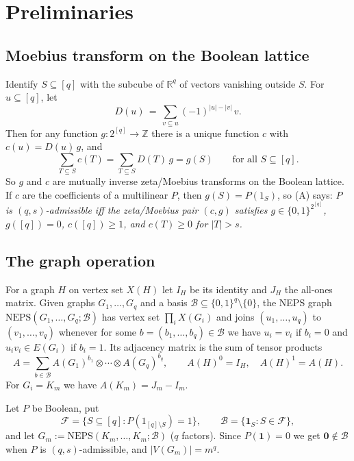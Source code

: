 \documentclass[11pt,a4paper]{article}
\theoremstyle{plain}
\theoremstyle{definition}
\newcommand{\ZZ}{\mathbb{Z}}
\begin{document}
\section{Preliminaries}

\subsection{Moebius transform on the Boolean lattice}

Identify $S\subseteq[q]$ with the subcube of $\mathbb R^q$ of vectors vanishing outside
$S$.  For $u\subseteq[q]$, let
\[
D(u)\,=\,\sum_{v\subseteq u}(-1)^{|u|-|v|}\,v .
\]
Then for any function $g:2^{[q]}\to\ZZ$ there is a unique function $c$ with
$c(u)=D(u)\,g$, and
\begin{equation}
\label{eq:zeta}
\sum_{T\subseteq S}c(T)=\sum_{T\subseteq S}D(T)\,g=g(S)\qquad\text{for all }S\subseteq[q].
\end{equation}
So $g$ and $c$ are mutually inverse zeta/Moebius transforms on the Boolean lattice.  If
$c$ are the coefficients of a multilinear $P$, then $g(S)=P(1_S)$, so \textup{(A)} says:
\emph{$P$ is $(q,s)$-admissible iff the zeta/Moebius pair $(c,g)$ satisfies
$g\in\{0,1\}^{2^{[q]}}$, $g([q])=0$, $c([q])\ge 1$, and $c(T)\ge 0$ for $|T|>s$.}

\subsection{The graph operation}
\label{sec:neps}

For a graph $H$ on vertex set $X(H)$ let $I_H$ be its identity and $J_H$ the all-ones
matrix.  Given graphs $G_1,\dots,G_q$ and a basis
$\mathcal B\subseteq\{0,1\}^q\setminus\{0\}$, the NEPS graph
$\mathrm{NEPS}(G_1,\dots,G_q;\mathcal B)$ has vertex set $\prod_i X(G_i)$ and joins
$(u_1,\dots,u_q)$ to $(v_1,\dots,v_q)$ whenever for some
$b=(b_1,\dots,b_q)\in\mathcal B$ we have $u_i=v_i$ if $b_i=0$ and
$u_iv_i\in E(G_i)$ if $b_i=1$.  Its adjacency matrix is the sum of tensor products
\[
A=\sum_{b\in\mathcal B} A(G_1)^{b_1}\otimes\cdots\otimes A(G_q)^{b_q},
\qquad A(H)^0=I_H,\quad A(H)^1=A(H).
\]
For $G_i=K_m$ we have $A(K_m)=J_m-I_m$.

Let $P$ be Boolean, put
\[
\mathcal F=\{S\subseteq[q]:P(1_{[q]\setminus S})=1\},\qquad
\mathcal B=\{\mathbf 1_S:S\in\mathcal F\},
\]
and let $G_m:=\mathrm{NEPS}(K_m,\dots,K_m;\mathcal B)$ ($q$ factors).  Since
$P(\mathbf 1)=0$ we get $\mathbf 0\notin\mathcal B$ when $P$ is $(q,s)$-admissible, and
$|V(G_m)|=m^q$.
\end{document}
